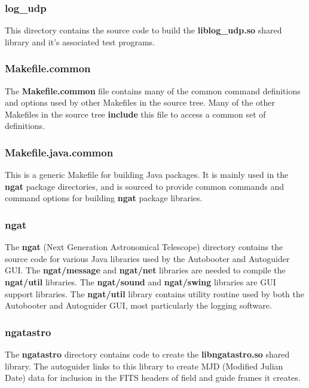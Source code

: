 \documentclass[10pt,a4paper]{article}
\begin{document}
\subsubsection{log\_udp}

This directory contains the source code to build the {\bf liblog\_udp.so} shared library and it's associated test programs. 

\subsubsection{Makefile.common}

The {\bf Makefile.common} file contains many of the common command definitions and options used by other Makefiles in the source tree. Many of the other Makefiles in the source tree {\bf include} this file to access a common set of definitions.

\subsubsection{Makefile.java.common}

This is a generic Makefile for building Java packages. It is mainly used in the {\bf ngat} package directories, and is sourced to provide common commands and command options for building {\bf ngat} package libraries.

\subsubsection{ngat}

The {\bf ngat} (Next Generation Astronomical Telescope) directory contains the source code for various Java libraries used by the Autobooter and Autoguider GUI. The {\bf ngat/message} and {\bf ngat/net} libraries are needed to compile the {\bf ngat/util} libraries. The {\bf ngat/sound} and {\bf ngat/swing} libraries are GUI support libraries. The {\bf ngat/util} library contains utility routine used by both the Autobooter and Autoguider GUI, most particularly the logging software.

\subsubsection{ngatastro}

The {\bf ngatastro} directory contains code to create the {\bf libngatastro.so} shared library. The autoguider links to this library to create MJD (Modified Julian Date) data for inclusion in the FITS headers of field and guide frames it creates.
\end{document}
